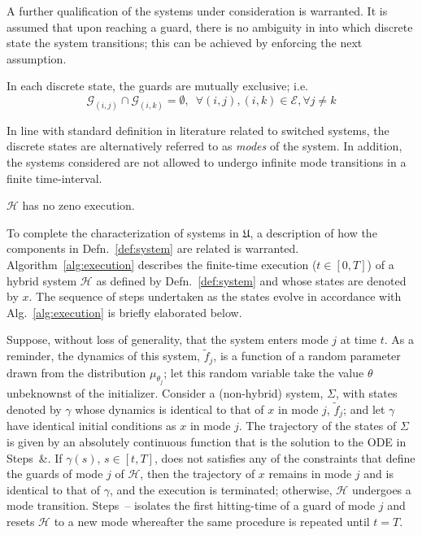 A further qualification of the systems under consideration is warranted. It is assumed that upon reaching a guard, there is no ambiguity in into which discrete state the system transitions; this can be achieved by enforcing the next assumption.
\begin{assump}
    In each discrete state, the guards are mutually exclusive; i.e.
    $$\mathcal G_{(i,j)}\cap \mathcal G_{(i,k)}=\emptyset,\phantom{8}\forall (i,j),(i,k)\in \mathcal E, \forall j\ne k$$
\end{assump}
In line with standard definition in literature related to switched systems, the discrete states are alternatively referred to as {\em modes} of the system. In addition, the systems considered are not allowed to undergo infinite mode transitions in a finite time-interval.
\begin{assump}
  $\mathcal H$ has no zeno execution.
\end{assump}
To complete the characterization of systems in $\mathfrak{U}$, a description of how the components in Defn.~\ref{def:system} are related is warranted. Algorithm~\ref{alg:execution} describes the finite-time execution ($t\in [0,T]$) of a hybrid system $\mathcal H$ as defined by Defn.~\ref{def:system} and whose states are denoted by $x$. The sequence of steps undertaken as the states evolve in accordance with Alg.~\ref{alg:execution} is briefly elaborated below.
\par
Suppose, without loss of generality, that the system enters mode $j$ at time $t$. As a reminder, the dynamics of this system, $\tilde f_j$, is a function of a random parameter drawn from the distribution $\mu_{\theta_j}$; let this random variable take the value $\theta$ unbeknownst of the initializer. Consider a (non-hybrid) system, $\Sigma$, with states denoted by $\gamma$ whose dynamics is identical to that of $x$ in mode $j$, $\tilde f_j$; and let $\gamma$ have identical initial conditions as $x$ in mode $j$. The trajectory of the states of $\Sigma$ is given by an absolutely continuous function that is the solution to the ODE in Steps~\&. If $\gamma(s),\,s\in [t,T]$, does not satisfies any of the constraints that define the guards of mode $j$ of $\mathcal H$, then the trajectory of $x$ remains in mode $j$ and is identical to that of $\gamma$, and the execution is terminated; otherwise, $\mathcal H$ undergoes a mode transition. Steps~-- isolates the first hitting-time of a guard of mode $j$ and resets $\mathcal H$ to a new mode whereafter the same procedure is repeated until $t=T$.
